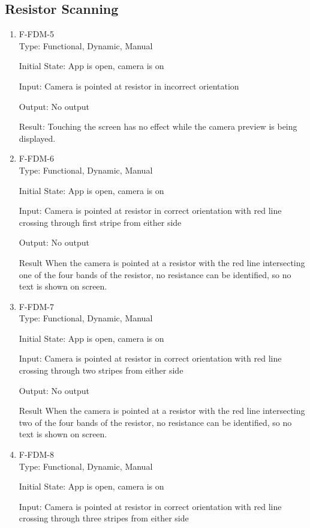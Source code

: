 \documentclass[12pt, titlepage]{article}
\begin{document}
\subsection{Resistor Scanning}
\begin{enumerate}
\item{F-FDM-5\\}
Type: Functional, Dynamic, Manual
					
Initial State: 
App is open, camera is on
					
Input: 
Camera is pointed at resistor in incorrect orientation
					
Output: 
No output
					
Result:
Touching the screen has no effect while the camera preview is being displayed.
					
\item{F-FDM-6\\}
Type: Functional, Dynamic, Manual
					
Initial State: 
App is open, camera is on
					
Input: 
Camera is pointed at resistor in correct orientation with red line crossing through first stripe from either side
					
Output: 
No output

Result
When the camera is pointed at a resistor with the red line intersecting one of the four bands of the resistor,
no resistance can be identified, so no text is shown on screen.

\item{F-FDM-7\\}
Type: Functional, Dynamic, Manual
					
Initial State: 
App is open, camera is on
					
Input: 
Camera is pointed at resistor in correct orientation with red line crossing through two stripes from either side
					
Output: 
No output	

Result
When the camera is pointed at a resistor with the red line intersecting two of the four bands of the resistor,
no resistance can be identified, so no text is shown on screen.

\item{F-FDM-8\\}
Type: Functional, Dynamic, Manual
					
Initial State: 
App is open, camera is on
					
Input: 
Camera is pointed at resistor in correct orientation with red line crossing through three stripes from either side
					

\end{enumerate}
\end{document}
